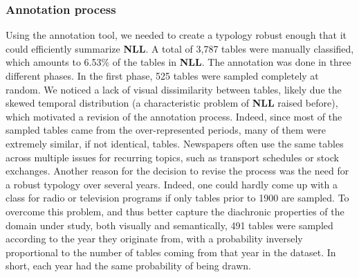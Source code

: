 \subsubsection{Annotation process}
Using the annotation tool, we needed to create a typology robust enough that it could efficiently summarize \textbf{NLL}. A total of 3,787 tables were manually classified, which amounts to 6.53\% of the tables in \textbf{NLL}. The annotation was done in three different phases. In the first phase, 525 tables were sampled completely at random. We noticed a lack of visual dissimilarity between tables, likely due the skewed temporal distribution (a characteristic problem of \textbf{NLL} raised before), which motivated a revision of the annotation process. Indeed, since most of the sampled tables came from the over-represented periods, many of them were extremely similar, if not identical, tables. Newspapers often use the same tables across multiple issues for recurring topics, such as transport schedules or stock exchanges. Another reason for the decision to revise the process was the need for a robust typology over several years. Indeed, one could hardly come up with a class for radio or television programs if only tables prior to 1900 are sampled. To overcome this problem, and thus better capture the diachronic properties of the domain under study, both visually and semantically, 491 tables were sampled according to the year they originate from, with a probability inversely proportional to the number of tables coming from that year in the dataset. In short, each year had the same probability of being drawn.\\

